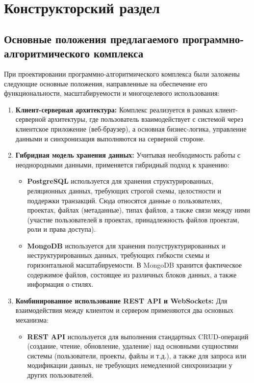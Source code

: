 \chapter{Конструкторский раздел}

\section{Основные положения предлагаемого программно-алгоритмического комплекса}

При проектировании программно-алгоритмического комплекса были заложены следующие основные положения, направленные на обеспечение его функциональности, масштабируемости и многоцелевого использования:

\begin{enumerate}[wide=12.5mm, leftmargin=12.5mm]
    \item \textbf{Клиент-серверная архитектура:} Комплекс реализуется в рамках клиент-серверной архитектуры, где пользователь взаимодействует с системой через клиентское приложение (веб-браузер), а основная бизнес-логика, управление данными и синхронизация выполняются на серверной стороне.
    \item \textbf{Гибридная модель хранения данных:} Учитывая необходимость работы с неоднородными данными, применяется гибридный подход к хранению:
        \begin{itemize}
            \item \textbf{PostgreSQL} используется для хранения структурированных, реляционных данных, требующих строгой схемы, целостности и поддержки транзакций. Сюда относятся данные о пользователях, проектах, файлах (метаданные), типах файлов, а также связи между ними (участие пользователей в проектах, принадлежность файлов проектам, роли и права доступа).
            \item \textbf{MongoDB} используется для хранения полуструктурированных и неструктурированных данных, требующих гибкости схемы и горизонтальной масштабируемости. В MongoDB хранится фактическое содержимое файлов, состоящее из различных блоков данных, а также информация о стилях.
        \end{itemize}
    \item \textbf{Комбинированное использование REST API и WebSockets:} Для взаимодействия между клиентом и сервером применяются два основных механизма:
        \begin{itemize}
            \item \textbf{REST API} используется для выполнения стандартных CRUD-операций (создание, чтение, обновление, удаление) над основными сущностями системы (пользователи, проекты, файлы и т.д.), а также для запроса или модификации данных, не требующих немедленной синхронизации у других пользователей.

\end{itemize}
\end{enumerate}
